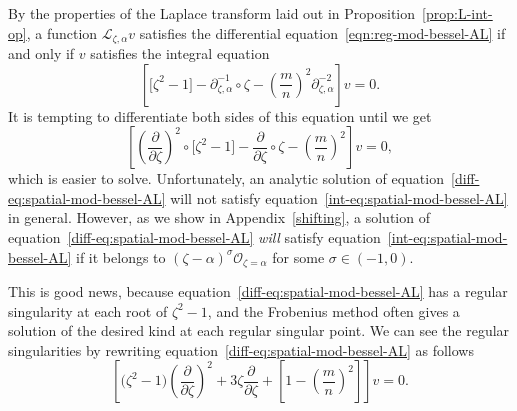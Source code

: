 \documentclass[pdftex]{sigma}
\newcommand{\fracderiv}[3]{\partial^{#1}_{#2, #3}}
\newcommand{\laplace}{\mathcal{L}}
\numberwithin{equation}{section}
\begin{document}
By the properties of the Laplace transform laid out in Proposition~\ref{prop:L-int-op}, a function $\laplace_{\zeta, \alpha} v$ satisfies the differential equation~\eqref{eqn:reg-mod-bessel-AL} if and only if $v$ satisfies the integral equation
\begin{equation}\label{int-eq:spatial-mod-bessel-AL}
\left[ \bigl[ \zeta^2 - 1 \bigr] - \fracderiv{-1}{\zeta}{\alpha} \circ \zeta - \left(\frac{m}{n}\right)^2 \fracderiv{-2}{\zeta}{\alpha} \right] v = 0.
\end{equation}
It is tempting to differentiate both sides of this equation until we get
\begin{equation}\label{diff-eq:spatial-mod-bessel-AL}
\left[ \left(\frac{\partial}{\partial \zeta}\right)^2 \circ \bigl[ \zeta^2 - 1 \bigr] - \frac{\partial}{\partial \zeta} \circ \zeta - \left(\frac{m}{n}\right)^2 \right] v = 0,
\end{equation}
which is easier to solve. Unfortunately, an analytic solution of equation~\eqref{diff-eq:spatial-mod-bessel-AL} will not satisfy equation~\eqref{int-eq:spatial-mod-bessel-AL} in general. However, as we show in Appendix~\ref{shifting}, a solution of equation~\eqref{diff-eq:spatial-mod-bessel-AL} {\em will} satisfy equation~\eqref{int-eq:spatial-mod-bessel-AL} if it belongs to $(\zeta - \alpha)^\sigma \mathcal{O}_{\zeta = \alpha}$ for some $\sigma \in (-1, 0)$.

This is good news, because equation~\eqref{diff-eq:spatial-mod-bessel-AL} has a regular singularity at each root of $\zeta^2 - 1$, and the Frobenius method often gives a solution of the desired kind at each regular singular point. We can see the regular singularities by rewriting equation~\eqref{diff-eq:spatial-mod-bessel-AL} as follows
\[ \left[ \bigl(\zeta^2 - 1\bigr) \left(\frac{\partial}{\partial \zeta}\right)^2 + 3\zeta \frac{\partial}{\partial \zeta} + \left[ 1 - \left(\frac{m}{n}\right)^2 \right] \right] v = 0. \]
\end{document}
